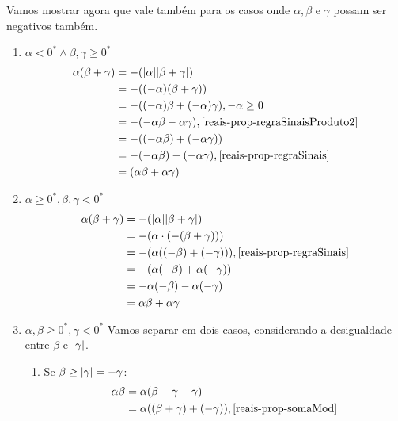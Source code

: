 \documentclass[../main.tex]{subfiles}
\begin{document}
\begin{dem}
    Vamos mostrar agora que vale também para os casos onde $\alpha, \beta$ e $\gamma$ possam ser negativos também.
    \begin{enumerate}
        \item 
            $\alpha < 0^* \land \beta, \gamma \geq 0^*$ 
            \begin{align*}
                \alpha (\beta + \gamma) &= -(\abs{\alpha}\abs{\beta+\gamma}) \\
                &= -((-\alpha)(\beta+\gamma)) \\
                &= -((-\alpha)\beta + (-\alpha)\gamma) , -\alpha \geq 0 \\
                &= - (-\alpha\beta - \alpha\gamma), \text{\Cref{reais-prop-regraSinaisProduto2}} \\
                &= - ((-\alpha\beta) + (-\alpha\gamma)) \\
                &= - (-\alpha\beta) - (-\alpha\gamma), \text{\Cref{reais-prop-regraSinais}} \\
                &= (\alpha\beta + \alpha\gamma)
            \end{align*}
        \item $\alpha \geq 0^*, \beta, \gamma < 0^*$
            \begin{align*}
                \alpha(\beta+\gamma) &= -(\abs{\alpha}\abs{\beta+\gamma}) \\
                &= - (\alpha \cdot (-(\beta+\gamma))) \\
                &= -(\alpha((-\beta)+(-\gamma))),  \text{\Cref{reais-prop-regraSinais}} \\
                &= -(\alpha(-\beta) + \alpha(-\gamma)) \\
                &=-\alpha(-\beta)-\alpha(-\gamma) \\
                &= \alpha\beta + \alpha\gamma
            \end{align*}
        \item $\alpha,\beta \geq 0^*, \gamma < 0^*$
            Vamos separar em dois casos, considerando a desigualdade entre $\beta$ e $\abs{\gamma}$.
            \begin{enumerate}
                \item Se $\beta \geq \abs{\gamma} = -\gamma$:
                    \begin{align*}
                        \alpha\beta &= \alpha(\beta+\gamma-\gamma) \\
                        &= \alpha((\beta+\gamma)+(-\gamma)) , \text{\Cref{reais-prop-somaMod}} \\

\end{align*}
\end{enumerate}
\end{enumerate}
\end{dem}
\end{document}
